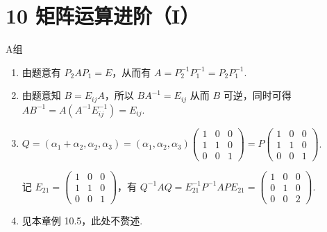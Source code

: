 \section*{10 矩阵运算进阶（I）}

\vspace{2ex}

\centerline{\heiti A组}
\begin{enumerate}
    \item 由题意有 $P_2AP_1 = E$，从而有 $A=P_2^{-1}P_1^{-1}=P_2P_1^{-1}$.
    \item 由题意知 $B = E_{ij}A$，所以 $BA^{-1}=E_{ij}$ 从而 $B$ 可逆，同时可得 $AB^{-1}=A(A^{-1}E_{ij}^{-1})=E_{ij}$.
    \item $Q = (\alpha_1+\alpha_2,\alpha_2,\alpha_3)=(\alpha_1,\alpha_2,\alpha_3)\begin{pmatrix}1 & 0 & 0 \\ 1 & 1 & 0 \\ 0 & 0 & 1\end{pmatrix}=P\begin{pmatrix}1 & 0 & 0 \\ 1 & 1 & 0 \\ 0 & 0 & 1\end{pmatrix}$.
    
    记 $E_{21}=\begin{pmatrix}1 & 0 & 0 \\ 1 & 1 & 0 \\ 0 & 0 & 1\end{pmatrix}$，有 $Q^{-1}AQ=E_{21}^{-1}P^{-1}APE_{21}=\begin{pmatrix}1 & 0 & 0 \\ 0 & 1 & 0 \\ 0 & 0 & 2\end{pmatrix}$.
    \item 见本章例 10.5，此处不赘述.
\end{enumerate}

